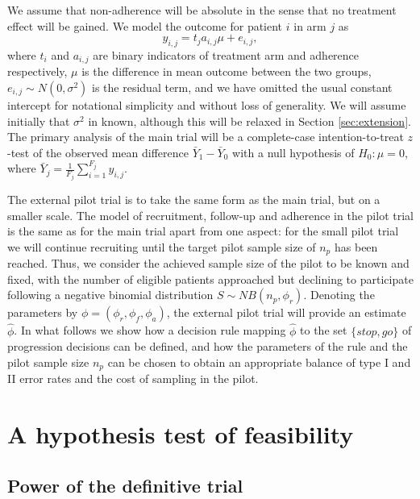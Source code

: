 \documentclass[AMA,STIX1COL]{WileyNJD-v2}
\begin{document}
We assume that non-adherence will be absolute in the sense that no treatment effect will be gained. We model the outcome for patient $i$ in arm $j$ as
$$
y_{i,j} = t_j a_{i,j} \mu + e_{i,j},
$$
where $t_i$ and $a_{i,j}$ are binary indicators of treatment arm and adherence respectively, $\mu$ is the difference in mean outcome between the two groups, $e_{i,j} \sim N(0, \sigma^2)$ is the residual term, and we have omitted the usual constant intercept for notational simplicity and without loss of generality. We will assume initially that $\sigma^2$ in known, although this will be relaxed in Section \ref{sec:extension}. The primary analysis of the main trial will be a complete-case intention-to-treat $z$-test of the observed mean difference $\bar{Y}_1 - \bar{Y}_0$ with a null hypothesis of $H_0: \mu = 0$, where $\bar{Y}_j = \frac{1}{F_j} \sum_{i=1}^{F_j} y_{i,j}$.

The external pilot trial is to take the same form as the main trial, but on a smaller scale. The model of recruitment, follow-up and adherence in the pilot trial is the same as for the main trial apart from one aspect: for the small pilot trial we will continue recruiting until the target pilot sample size of $n_p$ has been reached. Thus, we consider the achieved sample size of the pilot to be known and fixed, with the number of eligible patients approached but declining to participate following a negative binomial distribution $S \sim NB(n_p, \phi_r)$. Denoting the parameters by $\phi = (\phi_r, \phi_f, \phi_a)$, the external pilot trial will provide an estimate $\hat{\phi}$. In what follows we show how a decision rule mapping $\hat{\phi}$ to the set $\{stop, go\}$ of progression decisions can be defined, and how the parameters of the rule and the pilot sample size $n_p$ can be chosen to obtain an appropriate balance of type I and II error rates and the cost of sampling in the pilot.

\section{A hypothesis test of feasibility}\label{sec:methods}


\subsection{Power of the definitive trial}\label{sec:power}
\end{document}
